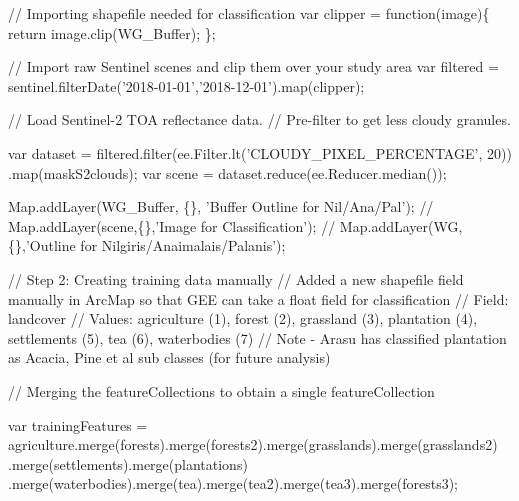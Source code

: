 \documentclass[]{article}
\newenvironment{Shaded}{}{}
\newcommand{\AttributeTok}[1]{#1}
\newcommand{\CommentTok}[1]{\textcolor[rgb]{0.00,0.50,0.00}{#1}}
\newcommand{\ControlFlowTok}[1]{\textcolor[rgb]{0.00,0.00,1.00}{#1}}
\newcommand{\DecValTok}[1]{#1}
\newcommand{\KeywordTok}[1]{\textcolor[rgb]{0.00,0.00,1.00}{#1}}
\newcommand{\NormalTok}[1]{#1}
\newcommand{\OperatorTok}[1]{#1}
\newcommand{\StringTok}[1]{\textcolor[rgb]{0.00,0.50,0.50}{#1}}
\newcommand{\VariableTok}[1]{#1}
\begin{document}
\begin{Shaded}
\begin{Highlighting}[numbers=left,,]
\CommentTok{// Importing shapefile needed for classification}
\KeywordTok{var}\NormalTok{ clipper }\OperatorTok{=} \KeywordTok{function}\NormalTok{(image)}\OperatorTok{\{}
  \ControlFlowTok{return} \VariableTok{image}\NormalTok{.}\AttributeTok{clip}\NormalTok{(WG_Buffer)}\OperatorTok{;}
\OperatorTok{\};}


\CommentTok{// Import raw Sentinel scenes and clip them over your study area}
\KeywordTok{var}\NormalTok{ filtered }\OperatorTok{=} \VariableTok{sentinel}\NormalTok{.}\AttributeTok{filterDate}\NormalTok{(}\StringTok{'2018-01-01'}\OperatorTok{,}\StringTok{'2018-12-01'}\NormalTok{).}\AttributeTok{map}\NormalTok{(clipper)}\OperatorTok{;}

\CommentTok{// Load Sentinel-2 TOA reflectance data.}
\CommentTok{// Pre-filter to get less cloudy granules.}

\KeywordTok{var}\NormalTok{ dataset }\OperatorTok{=} \VariableTok{filtered}\NormalTok{.}\AttributeTok{filter}\NormalTok{(}\VariableTok{ee}\NormalTok{.}\VariableTok{Filter}\NormalTok{.}\AttributeTok{lt}\NormalTok{(}\StringTok{'CLOUDY_PIXEL_PERCENTAGE'}\OperatorTok{,} \DecValTok{20}\NormalTok{))}
\NormalTok{                  .}\AttributeTok{map}\NormalTok{(maskS2clouds)}\OperatorTok{;}
\KeywordTok{var}\NormalTok{ scene }\OperatorTok{=} \VariableTok{dataset}\NormalTok{.}\AttributeTok{reduce}\NormalTok{(}\VariableTok{ee}\NormalTok{.}\VariableTok{Reducer}\NormalTok{.}\AttributeTok{median}\NormalTok{())}\OperatorTok{;}

\VariableTok{Map}\NormalTok{.}\AttributeTok{addLayer}\NormalTok{(WG_Buffer}\OperatorTok{,} \OperatorTok{\{\},} \StringTok{'Buffer Outline for Nil/Ana/Pal'}\NormalTok{)}\OperatorTok{;}
\CommentTok{// Map.addLayer(scene,\{\},'Image for Classification');}
\CommentTok{// Map.addLayer(WG, \{\},'Outline for Nilgiris/Anaimalais/Palanis');}


\CommentTok{// Step 2: Creating training data manually}
\CommentTok{// Added a new shapefile field manually in ArcMap so that GEE can take a float field for classification}
\CommentTok{// Field: landcover}
\CommentTok{// Values: agriculture (1), forest (2), grassland (3), plantation (4), settlements (5), tea (6), waterbodies (7)}
\CommentTok{// Note - Arasu has classified plantation as Acacia, Pine et al sub classes (for future analysis)}

\CommentTok{// Merging the featureCollections to obtain a single featureCollection}

\KeywordTok{var}\NormalTok{ trainingFeatures }\OperatorTok{=} \VariableTok{agriculture}\NormalTok{.}\AttributeTok{merge}\NormalTok{(forests).}\AttributeTok{merge}\NormalTok{(forests2).}\AttributeTok{merge}\NormalTok{(grasslands).}\AttributeTok{merge}\NormalTok{(grasslands2)}
\NormalTok{                               .}\AttributeTok{merge}\NormalTok{(settlements).}\AttributeTok{merge}\NormalTok{(plantations)}
\NormalTok{                            .}\AttributeTok{merge}\NormalTok{(waterbodies).}\AttributeTok{merge}\NormalTok{(tea).}\AttributeTok{merge}\NormalTok{(tea2).}\AttributeTok{merge}\NormalTok{(tea3).}\AttributeTok{merge}\NormalTok{(forests3)}\OperatorTok{;}


\end{Highlighting}
\end{Shaded}
\end{document}
